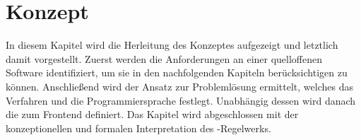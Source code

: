 \chapter{Konzept}\label{ch:konzept}

In diesem Kapitel wird die Herleitung des Konzeptes aufgezeigt und letztlich damit vorgestellt.
Zuerst werden die Anforderungen an einer quelloffenen Software identifiziert, um sie in den nachfolgenden Kapiteln berücksichtigen zu können.
Anschließend wird der Ansatz zur Problemlösung ermittelt, welches das Verfahren und die Programmiersprache festlegt.
Unabhängig dessen wird danach die  zum Frontend definiert.
Das Kapitel wird abgeschlossen mit der konzeptionellen und formalen Interpretation des -Regelwerks.


